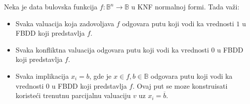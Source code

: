 \begin{obsn}
    Neka je data bulovska funkcija $f : \mathbb{B}^{n} \rightarrow \mathbb{B}$  u KNF normalnoj formi. Tada va\v{z}i:
    \begin{itemize}
        \item Svaka valuacija koja zadovoljava $f$ odgovara putu koji vodi ka vrednosti $1$ u FBDD koji predstavlja $f$.
        \item Svaka konfliktna valuacija odgovara putu koji vodi ka vrednosti $0$ u FBDD koji predstavlja $f$.
        \item Svaka implikacija $x_{i} = b$, gde je $x \in f, b \in \mathbb{B}$ odgovara putu koji vodi ka vrednosti $0$ u FBDD koji predstavlja $f$. Ovaj put se moze konstruisati koriste\'c{}i trenutnu parcijalnu valuaciju $v$ uz $x_{i} = \overline{b}$.
    \end{itemize}
\end{obsn}

